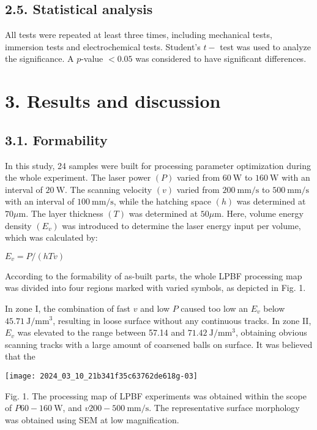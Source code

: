 \documentclass[10pt]{article}
\begin{document}
\subsection*{2.5. Statistical analysis}
All tests were repeated at least three times, including mechanical tests, immersion tests and electrochemical tests. Student's $t-$ test was used to analyze the significance. A $p$-value $<0.05$ was considered to have significant differences.

\section*{3. Results and discussion}
\subsection*{3.1. Formability}
In this study, 24 samples were built for processing parameter optimization during the whole experiment. The laser power $(P)$ varied from $60 \mathrm{~W}$ to $160 \mathrm{~W}$ with an interval of $20 \mathrm{~W}$. The scanning velocity $(v)$ varied from $200 \mathrm{~mm} / \mathrm{s}$ to $500 \mathrm{~mm} / \mathrm{s}$ with an interval of $100 \mathrm{~mm} / \mathrm{s}$, while the hatching space $(h)$ was determined at $70 \mu \mathrm{m}$. The layer thickness $(T)$ was determined at $50 \mu \mathrm{m}$. Here, volume energy density $\left(E_{v}\right)$ was introduced to determine the laser energy input per volume, which was calculated by:

$E_{v}=P /(h T v)$

According to the formability of as-built parts, the whole LPBF processing map was divided into four regions marked with varied symbols, as depicted in Fig. 1.

In zone I, the combination of fast $v$ and low $P$ caused too low an $E_{v}$ below $45.71 \mathrm{~J} / \mathrm{mm}^{3}$, resulting in loose surface without any continuous tracks. In zone II, $E_{v}$ was elevated to the range between 57.14 and $71.42 \mathrm{~J} / \mathrm{mm}^{3}$, obtaining obvious scanning tracks with a large amount of coarsened balls on surface. It was believed that the

\begin{center}
\texttt{[image: 2024\_03\_10\_21b341f35c63762de618g-03]}
\end{center}

Fig. 1. The processing map of LPBF experiments was obtained within the scope of $P 60-160 \mathrm{~W}$, and $v 200-500 \mathrm{~mm} / \mathrm{s}$. The representative surface morphology was obtained using SEM at low magnification.
\end{document}

